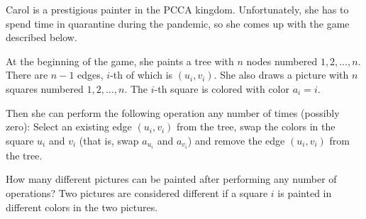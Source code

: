 Carol is a prestigious painter in the PCCA kingdom.
Unfortunately, she has to spend time in quarantine during the pandemic, so she comes up with the game described below.

At the beginning of the game, she paints a tree with $n$ nodes numbered $1,2,\ldots,n$.
There are $n-1$ edges, $i$-th of which is $(u_i,v_i)$.
She also draws a picture with $n$ squares numbered $1,2,\ldots,n$.
The $i$-th square is colored with color $a_i = i$.

Then she can perform the following operation any number of times (possibly zero):
Select an existing edge $(u_i,v_i)$ from the tree, swap the colors in the square $u_i$ and $v_i$ (that is, swap $a_{u_i}$ and $a_{v_i}$) and remove the edge $(u_i,v_i)$ from the tree.

How many different pictures can be painted after performing any number of operations?
Two pictures are considered different if a square $i$ is painted in different colors in the two pictures.